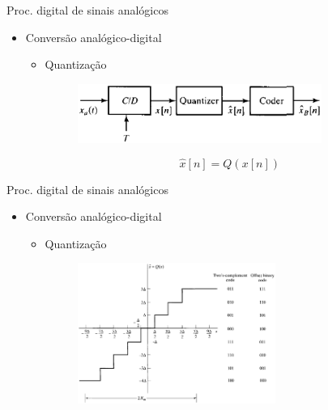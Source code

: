 \begin{slide}{Proc. digital de sinais anal\'ogicos}
\begin{itemize}
   \item Conversão analógico-digital
   \begin{itemize}
      \item Quantização 
      \begin{figure}
        \centering
         \includegraphics[width = 0.8\textwidth]{figs/ad_conv4.eps}
      \end{figure}
\begin{equation}
          \hat x[n] = Q(x[n])
      \end{equation}
   \end{itemize}
\end{itemize}
\end{slide}

\begin{slide}{Proc. digital de sinais anal\'ogicos}
\begin{itemize}
   \item Conversão analógico-digital
   \begin{itemize}
      \item Quantização 
      \begin{figure}
        \centering
         \includegraphics[width = 0.65\textwidth]{figs/ad_quantz.eps}
      \end{figure}

   \end{itemize}
\end{itemize}
\end{slide}


